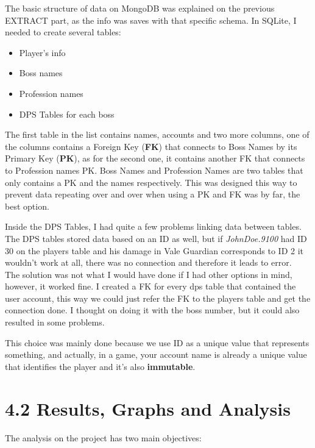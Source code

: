 \documentclass[12pt,a4paper]{article}
\begin{document}
    The basic structure of data on MongoDB was explained on the previous EXTRACT part, as the info was saves with
    that specific schema. In SQLite, I needed to create several tables:

    \begin{itemize}
        \item Player's info
        \item Boss names
        \item Profession names
        \item DPS Tables for each boss
    \end{itemize}
    
    \bigskip

    The first table in the list contains names, accounts and two more columns, one of the columns contains a Foreign
    Key (\textbf{FK}) that connects to Boss Names by its Primary Key (\textbf{PK}), as for the second one, it
    contains another FK that connects to Profession names PK. Boss Names and Profession Names are two tables that
    only contains a PK and the names respectively. This was designed this way to prevent data repeating over and over
    when using a PK and FK was by far, the best option.

    \newpage

    Inside the DPS Tables, I had quite a few problems linking data between tables. The DPS tables stored data based 
    on an ID as well, but if \textit{JohnDoe.9100} had ID 30 on the players table and his damage in Vale Guardian corresponds 
    to ID 2 it wouldn't work at all, there was no connection and therefore it leads to error.\\

    The solution was not what I would have done if I had other options in mind, however, it worked fine. I created a FK 
    for every dps table that contained the user account, this way we could just refer the FK to the players table and get 
    the connection done. I thought on doing it with the boss number, but it could also resulted in some problems.

    This choice was mainly done because we use ID as a unique value that represents something, and actually, in a game, your 
    account name is already a unique value that identifies the player and it's also \textbf{immutable}.

    \section*{\large 4.2 Results, Graphs and Analysis}
    The analysis on the project has two main objectives:
\end{document}
